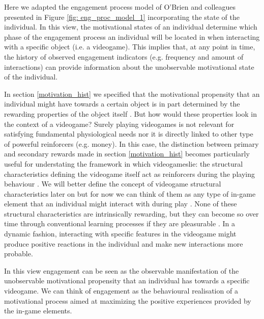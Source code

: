 

Here we adapted the engagement process model of O'Brien and colleagues \cite{o2008user} presented in Figure \ref{fig: eng_proc_model_1} incorporating the state of the individual. In this view, the motivational states of an individual determine which phase of the engagement process an individual will be located in when interacting with a specific object (i.e. a videogame). This implies that, at any point in time, the history of observed engagement indicators (e.g. frequency and amount of interactions) can provide information about the  unobservable motivational state of the individual. 

In section \ref{motivation_hist} we specified that the motivational propensity that an individual might have towards a certain object is in part determined by the rewarding properties of the object itself \cite{berridge2004motivation}. But how would these properties look in the context of a videogame? Surely playing videogames is not relevant for satisfying fundamental physiological needs nor it is directly linked to other type of powerful reinforcers (e.g. money). In this case, the distinction between primary and secondary rewards made in section \ref{motivation_hist} becomes particularly useful for understating the framework in which videogameslie: the structural characteristics defining the videogame itself act as reinforcers during the playing behaviour \cite{king2010role, king2010video, yannakakis2013player}. We will better define the concept of videogame structural characteristics later on but for now we can think of them as any type of in-game element that an individual might interact with during play \cite{king2010role,king2010video}. None of these structural characteristics are intrinsically rewarding, but they can become so over time through conventional learning processes if they are pleasurable \cite{skinner1953science, berridge2004motivation, przybylski2010motivational}. In a dynamic fashion, interacting with specific features in the videogame might produce positive reactions in the individual and make new interactions more probable. 

In this view engagement can be seen as the observable manifestation of the unobservable motivational propensity that an individual has towards a specific videogame. We can think of engagement as the behavioural realisation of a motivational process aimed at maximizing the positive experiences provided by the in-game elements. 

